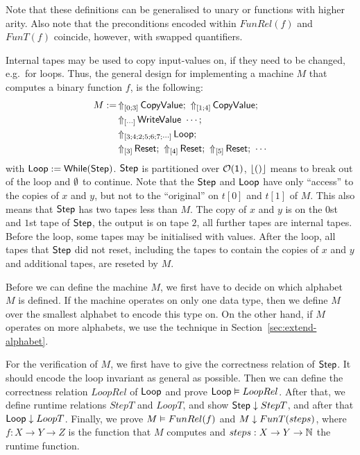 Note that these definitions can be generalised to unary or functions with higher arity.  Also note that the preconditions encoded within $FunRel(f)$
and $FunT(f)$ coincide, however, with swapped quantifiers.

Internal tapes may be used to copy input-values on, if they need to be changed, e.g.\ for loops.  Thus, the general design for implementing a machine
$M$ that computes a binary function $f$, is the following:
\begin{align*}
  M := & \LiftTapes{\MS{CopyValue}}{\Vector{0; 3}} \Seq \LiftTapes{\MS{CopyValue}}{\Vector{1; 4}} \Seq \\
       & \LiftTapes{\MS{WriteValue}~\cdots}{\Vector{\cdots}} \Seq \\
       & \LiftTapes{\MS{Loop}}{\Vector{3; 4; 2; 5; 6; 7; \cdots}} \Seq \\
       & \LiftTapes{\MS{Reset}}{\Vector{3}} \Seq \LiftTapes{\MS{Reset}}{\Vector{4}} \Seq \LiftTapes{\MS{Reset}}{\Vector{5}} \Seq \cdots
\end{align*}
with $\mathsf{Loop} := \mathsf{While}(\mathsf{Step})$.  $\mathsf{Step}$ is partitioned over $\mathcal{O}(\mathsf{1})$, $\left\lfloor {\ensuremath{\mathsf{()}}} \right\rfloor$ means to break out of the loop and $\emptyset$ to
continue.  Note that the $\mathsf{Step}$ and $\mathsf{Loop}$ have only ``access'' to the copies of $x$ and $y$, but not to the ``original'' on $t[0]$ and
$t[1]$ of $M$.  This also means that $\mathsf{Step}$ has two tapes less than $M$.  The copy of $x$ and $y$ is on the $0$st and $1$st tape of $\mathsf{Step}$,
the output is on tape $2$, all further tapes are internal tapes.  Before the loop, some tapes may be initialised with values.  After the loop, all
tapes that $\mathsf{Step}$ did not reset, including the tapes to contain the copies of $x$ and $y$ and additional tapes, are reseted by $M$.

Before we can define the machine $M$, we first have to decide on which alphabet $M$ is defined.  If the machine operates on only one data type, then
we define $M$ over the smallest alphabet to encode this type on.  On the other hand, if $M$ operates on more alphabets, we use the technique in
Section~\ref{sec:extend-alphabet}.

For the verification of $M$, we first have to give the correctness relation of $\mathsf{Step}$.  It should encode the loop invariant as general as
possible.  Then we can define the correctness relation $LoopRel$ of $\mathsf{Loop}$ and prove $\mathsf{Loop} \mathrel{\vDash} LoopRel$.  After that, we define runtime
relations $StepT$ and $LoopT$, and show $\mathsf{Step} \mathrel{\downarrow} StepT$, and after that $\mathsf{Loop} \mathrel{\downarrow} LoopT$.  Finally, we prove
$M \mathrel{\vDash} FunRel(f)$ and $M \mathrel{\downarrow} FunT(steps)$, where $f:X \to Y \to Z$ is the function that $M$ computes and $steps:X \rightarrow Y \rightarrow \mathbb{N}$ the
runtime function.


